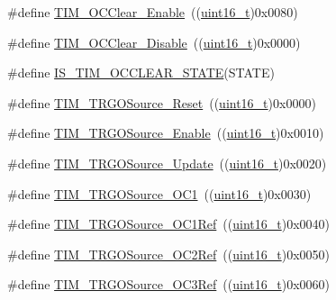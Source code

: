 \begin{DoxyCompactItemize}
\item 
\#define \hyperlink{group___t_i_m___output___compare___clear___state_ga1b7bce48b3e1478aad98c95fbbe7a6e0}{T\+I\+M\+\_\+\+O\+C\+Clear\+\_\+\+Enable}~((\hyperlink{_p_e___types_8h_a1f1825b69244eb3ad2c7165ddc99c956}{uint16\+\_\+t})0x0080)
\item 
\#define \hyperlink{group___t_i_m___output___compare___clear___state_gadb09946cb5dded7520baf4b19173204d}{T\+I\+M\+\_\+\+O\+C\+Clear\+\_\+\+Disable}~((\hyperlink{_p_e___types_8h_a1f1825b69244eb3ad2c7165ddc99c956}{uint16\+\_\+t})0x0000)
\item 
\#define \hyperlink{group___t_i_m___output___compare___clear___state_ga5297586b42da9263ac4f767c83202fed}{I\+S\+\_\+\+T\+I\+M\+\_\+\+O\+C\+C\+L\+E\+A\+R\+\_\+\+S\+T\+A\+TE}(S\+T\+A\+TE)
\item 
\#define \hyperlink{group___t_i_m___trigger___output___source_gafb039ed39279a4d1134b234797b1cdfb}{T\+I\+M\+\_\+\+T\+R\+G\+O\+Source\+\_\+\+Reset}~((\hyperlink{_p_e___types_8h_a1f1825b69244eb3ad2c7165ddc99c956}{uint16\+\_\+t})0x0000)
\item 
\#define \hyperlink{group___t_i_m___trigger___output___source_gaa228ba6cfafcf676e33e3ee35cb7fc1c}{T\+I\+M\+\_\+\+T\+R\+G\+O\+Source\+\_\+\+Enable}~((\hyperlink{_p_e___types_8h_a1f1825b69244eb3ad2c7165ddc99c956}{uint16\+\_\+t})0x0010)
\item 
\#define \hyperlink{group___t_i_m___trigger___output___source_ga8a73c717070ab1a0ef90326780f20aef}{T\+I\+M\+\_\+\+T\+R\+G\+O\+Source\+\_\+\+Update}~((\hyperlink{_p_e___types_8h_a1f1825b69244eb3ad2c7165ddc99c956}{uint16\+\_\+t})0x0020)
\item 
\#define \hyperlink{group___t_i_m___trigger___output___source_ga2d044b472c021f5484b9f71eb9ca69f1}{T\+I\+M\+\_\+\+T\+R\+G\+O\+Source\+\_\+\+O\+C1}~((\hyperlink{_p_e___types_8h_a1f1825b69244eb3ad2c7165ddc99c956}{uint16\+\_\+t})0x0030)
\item 
\#define \hyperlink{group___t_i_m___trigger___output___source_ga7cb70a2a026dc02136bdbb3dcc483d6c}{T\+I\+M\+\_\+\+T\+R\+G\+O\+Source\+\_\+\+O\+C1\+Ref}~((\hyperlink{_p_e___types_8h_a1f1825b69244eb3ad2c7165ddc99c956}{uint16\+\_\+t})0x0040)
\item 
\#define \hyperlink{group___t_i_m___trigger___output___source_ga059f9f6cf96c833180eb3cdf5e56bd04}{T\+I\+M\+\_\+\+T\+R\+G\+O\+Source\+\_\+\+O\+C2\+Ref}~((\hyperlink{_p_e___types_8h_a1f1825b69244eb3ad2c7165ddc99c956}{uint16\+\_\+t})0x0050)
\item 
\#define \hyperlink{group___t_i_m___trigger___output___source_ga40943bc1c3f22b983c683cbf0e87a218}{T\+I\+M\+\_\+\+T\+R\+G\+O\+Source\+\_\+\+O\+C3\+Ref}~((\hyperlink{_p_e___types_8h_a1f1825b69244eb3ad2c7165ddc99c956}{uint16\+\_\+t})0x0060)

\end{DoxyCompactItemize}
